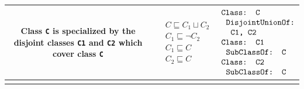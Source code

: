 \documentclass[11pt,final,onecolumn]{report}
\newcommand\umltablespacing{3cm}
\newcommand\dltablespacing{4.5cm}
\newcommand\owlspacing{-1mm}
\begin{document}
\begin{longtable}{|>{\scriptsize}c|>{\scriptsize}l|>{\scriptsize}l|}
\begin{minipage}{\umltablespacing}
      Class \texttt{C} is specialized by the disjoint classes \texttt{C1} and \texttt{C2} which cover class \texttt{C}  
     \vspace{2mm}
    \end{minipage}
    &
    \begin{minipage}{\dltablespacing}
       $\begin{aligned}   
	  &C \sqsubseteq C_1 \sqcup C_2\\
	  &C_1 \sqsubseteq \neg C_2\\
	  &C_1 \sqsubseteq C  \\  
	  &C_2 \sqsubseteq C 
       \end{aligned}$     
    \end{minipage}
    &
      $\begin{aligned}
	  &\texttt{Class: C}\\[\owlspacing]
	  &\texttt{\hspace*{0.20cm}DisjointUnionOf:}\\[\owlspacing]
	  &\texttt{\hspace*{0.40cm}C1, C2}\\[\owlspacing]
          &\texttt{Class: C1}\\[\owlspacing]
	  &\texttt{\hspace*{0.20cm}SubClassOf: C}\\[\owlspacing]
          &\texttt{Class: C2}\\[\owlspacing]
          &\texttt{\hspace*{0.20cm}SubClassOf: C}	
     \end{aligned}$
     \\\hline     
    \begin{minipage}{\umltablespacing}

\end{minipage}
\end{longtable}
\end{document}
